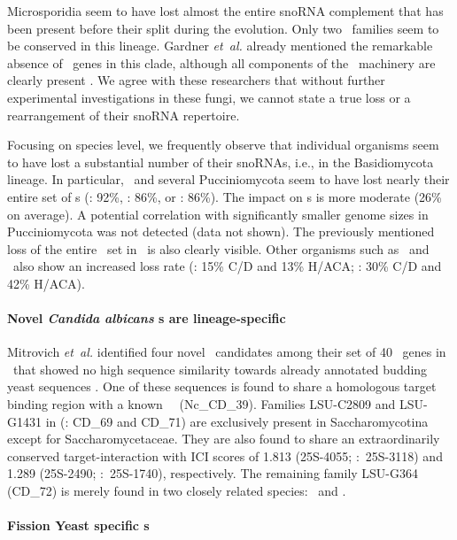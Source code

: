 Microsporidia seem to have lost almost the entire snoRNA complement
that has been present before their split during the evolution.  Only
two \cd\ families seem to be conserved in this lineage.  Gardner
\emph{et~al.} already mentioned the remarkable absence of \sno\ genes
in this clade, although all components of the \sno\ machinery are
clearly present \cite{Gardner:2010}.  We agree with these researchers
that without further experimental investigations in these fungi, we
cannot state a true loss or a rearrangement of their snoRNA
repertoire.

Focusing on species level, we frequently observe that individual
organisms seem to have lost a substantial number of their snoRNAs, i.e., in
the Basidiomycota lineage.  In particular, \wse\ and several
Pucciniomycota seem to have lost nearly their entire set of \haca s
(\wse: 92\%, \rmi: 86\%, or \sli: 86\%). The impact on \cd s is more
moderate (26\% on average). A potential correlation with significantly
smaller genome sizes in Pucciniomycota was not detected (data not
shown). The previously mentioned loss of the entire \haca\ set in
\Ptt\ is also clearly visible. Other organisms such as \pan\ and \opi\
also show an increased loss rate (\pan: 15\% C/D and 13\% H/ACA; \opi:
30\% C/D and 42\% H/ACA).

\paragraph{\textbf{Novel \emph{Candida albicans} \sno s are lineage-specific}}

Mitrovich \emph{et~al.} identified four novel \sno\ candidates among
their set of 40 \sno\ genes in \calb\ that showed no high sequence similarity
towards already annotated budding yeast sequences
\cite{Mitrovich:2010}. One of these sequences is found to share a
homologous target binding region with a known \ncr\ \sno\
(Nc\_CD\_39). Families LSU-C2809 and LSU-G1431 in
\cite{Mitrovich:2010} (\snostrip: CD\_69 and CD\_71) are exclusively
present in Saccharomycotina except for Saccharomycetaceae. They are
also found to share an extraordinarily conserved target-interaction with
ICI scores of 1.813 (25S-4055; \calb:~25S-3118) and 1.289 (25S-2490;
\calb:~25S-1740), respectively. The remaining family LSU-G364 (CD\_72)
is merely found in two closely related species: \cdu\ and \ctr.

\paragraph{\textbf{Fission Yeast specific \sno s}}

